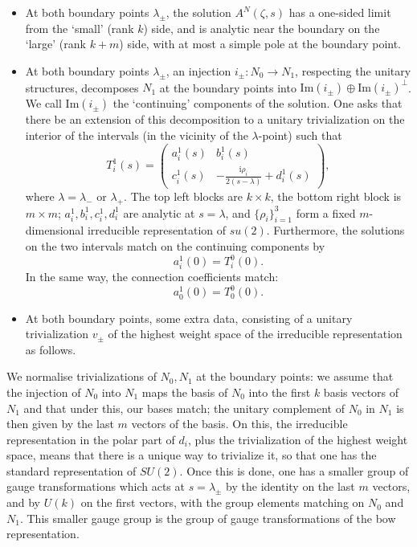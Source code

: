 \documentclass[12pt]{article}
\theoremstyle{definition}
\theoremstyle{remark}
\numberwithin{theorem}{section}
\renewcommand{\i}{\mathrm{i}}
\begin{document}
 \begin{itemize}
 \item At both boundary points $\lambda_\pm$, the solution $A^N(\zeta,s)$ has a one-sided limit from the `small' (rank $k$) side, and is analytic near the boundary on the `large' (rank $k+m$) side, with at most a simple pole at the boundary point.
 \item   At both boundary points $\lambda_\pm$, an injection
$i_\pm\colon N_0\rightarrow N_1$, respecting the unitary structures,  decomposes $N_1$ at the boundary points into $\mathrm{Im}(i_\pm)\oplus  \mathrm{Im}(i_\pm)^\perp$. We call $\mathrm{Im}(i_\pm)$ the `continuing' components of the solution. One asks that there be an extension of
this decomposition to a unitary trivialization on the interior of the
intervals (in the vicinity of the $\lambda$-point) such that %
\begin{equation*}
T^1_i(s)=\begin{pmatrix}a^1_i(s)                & b^1_i( s)\\
                        c^1_i(s)&-\frac{\i \rho_i}{2(s-\lambda)}+d^1_i(s)                 \end{pmatrix},
                         \end{equation*}
where $\lambda=\lambda_-$ or $\lambda_+.$ The top left blocks are $k\times k$, the bottom right block is
$m\times m$; $a^1_i,b^1_i,c^1_i, d^1_i$ are analytic at $s=\lambda$, and $\{\rho_i\}_{i=1}^3$ form a fixed  $m$-dimensional irreducible representation  of $su(2)$. 
Furthermore, the  solutions on the two intervals match on the continuing components  by 
\begin{equation*}
a^1_i(0) = T^0_i(0).
\end{equation*}
In the same way, the connection coefficients match:
\begin{equation*}
a^1_0(0) = T^0_0(0).
\end{equation*}

\item At both boundary points, some extra data, consisting of a
unitary trivialization $v_\pm$ of the highest weight space of the irreducible representation as follows.
\end{itemize}
We normalise trivializations of $N_0, N_1$ at the boundary points: we assume that the injection of $N_0$ into $N_1$ maps the basis of $N_0$ into the   first $k$ basis vectors of $N_1$ and that under this, our bases match; the unitary complement of $N_0$ in  $N_1$  is then given by the last $m$ vectors of the basis. On this, the irreducible representation in the polar part of $d_i$, plus the trivialization of the highest weight space, means that there is a unique way to trivialize it, so that one has the standard representation of $SU(2)$.  Once this is done, one has a smaller  group of gauge transformations which acts at $s=\lambda_\pm$ by the identity on the last $m$ vectors, and by $U(k)$ on the first vectors, with the group elements matching on $N_0$ and $N_1$. This smaller gauge group is the group of gauge transformations of the bow representation.
\bigskip
\end{document}
